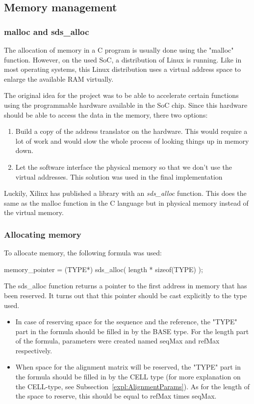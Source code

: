 \subsection{Memory management}

\subsubsection{malloc and sds\_alloc}
The allocation of memory in a C program is usually done using the "malloc" function. However, on the used SoC, a distribution of Linux is running. Like in most operating systems, this Linux distribution uses a virtual address space to enlarge the available RAM virtually. 

The original idea for the project was to be able to accelerate certain functions using the programmable hardware available in the SoC chip. Since this hardware should be able to access the data in the memory, there two options:
\begin{enumerate}
	\item Build a copy of the address translator on the hardware. This would require a lot of work and would slow the whole process of looking things up in memory down.
	\item Let the software interface the physical memory so that we don't use the virtual addresses. This solution was used in the final implementation
\end{enumerate}

Luckily, Xilinx has published a library with an \emph{sds\_alloc} function. This does the same as the malloc function in the C language but in physical memory instead of the virtual memory.

\subsubsection{Allocating memory}
To allocate memory, the following formula was used:

\begin{lcverbatim}
memory_pointer = (TYPE*) sds_alloc( length * sizeof(TYPE) );
\end{lcverbatim}

The sds\_alloc function returns a pointer to the first address in memory that has been reserved. It turns out that this pointer should be cast explicitly to the type used.

\begin{itemize}
	\item In case of reserving space for the sequence and the reference, the "TYPE" part in the formula should be filled in by the BASE type. For the length part of the formula, parameters were created named seqMax and refMax respectively.
	\item When space for the alignment matrix will be reserved, the "TYPE" part in the formula should be filled in by the CELL type (for more explanation on the CELL-type, see Subsection~\ref{expl:AlignmentParams}). As for the length of the space to reserve, this should be equal to refMax times seqMax.
\end{itemize}

